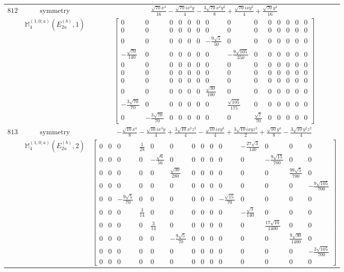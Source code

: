 \documentclass[fleqn,8pt,landscape]{jsarticle}
\begin{document}
\begin{longtable}{ccc}
$ 812 $ & $ \text{symmetry} $ & $ \frac{\sqrt{70} x^{4}}{16} - \frac{\sqrt{70} i x^{3} y}{4} - \frac{3 \sqrt{70} x^{2} y^{2}}{8} + \frac{\sqrt{70} i x y^{3}}{4} + \frac{\sqrt{70} y^{4}}{16} $ \\
$  $ & $ \mathbb{M}_{4}^{(1,0;a)}(E_{2u}^{(b)},1) $ & $ \begin{bmatrix} 0 & 0 & 0 & 0 & 0 & 0 & 0 & 0 & 0 & 0 & 0 & 0 & 0 & 0 \\ 0 & 0 & 0 & 0 & 0 & 0 & 0 & 0 & 0 & 0 & 0 & 0 & 0 & 0 \\ 0 & 0 & 0 & 0 & 0 & 0 & - \frac{9 \sqrt{5}}{50} & 0 & 0 & 0 & 0 & 0 & 0 & 0 \\ - \frac{\sqrt{70}}{140} & 0 & 0 & 0 & 0 & 0 & 0 & - \frac{9 \sqrt{105}}{350} & 0 & 0 & 0 & 0 & 0 & 0 \\ 0 & 0 & 0 & 0 & 0 & 0 & 0 & 0 & 0 & 0 & 0 & 0 & 0 & 0 \\ 0 & 0 & 0 & 0 & 0 & 0 & 0 & 0 & 0 & 0 & 0 & 0 & 0 & 0 \\ 0 & 0 & 0 & 0 & 0 & 0 & 0 & 0 & 0 & 0 & 0 & 0 & 0 & 0 \\ 0 & 0 & 0 & 0 & 0 & 0 & \frac{\sqrt{30}}{100} & 0 & 0 & 0 & 0 & 0 & 0 & 0 \\ - \frac{3 \sqrt{70}}{70} & 0 & 0 & 0 & 0 & 0 & 0 & \frac{\sqrt{105}}{175} & 0 & 0 & 0 & 0 & 0 & 0 \\ 0 & - \frac{3 \sqrt{70}}{70} & 0 & 0 & 0 & 0 & 0 & 0 & \frac{\sqrt{7}}{70} & 0 & 0 & 0 & 0 & 0 \end{bmatrix} $ \\ \hline
$ 813 $ & $ \text{symmetry} $ & $ - \frac{\sqrt{10} x^{4}}{8} - \frac{\sqrt{10} i x^{3} y}{4} + \frac{3 \sqrt{10} x^{2} z^{2}}{4} - \frac{\sqrt{10} i x y^{3}}{4} + \frac{3 \sqrt{10} i x y z^{2}}{2} + \frac{\sqrt{10} y^{4}}{8} - \frac{3 \sqrt{10} y^{2} z^{2}}{4} $ \\
$  $ & $ \mathbb{M}_{4}^{(1,0;a)}(E_{2u}^{(b)},2) $ & $ \begin{bmatrix} 0 & 0 & 0 & \frac{1}{28} & 0 & 0 & 0 & 0 & 0 & 0 & - \frac{27 \sqrt{3}}{140} & 0 & 0 & 0 \\ 0 & 0 & 0 & 0 & - \frac{\sqrt{6}}{56} & 0 & 0 & 0 & 0 & 0 & 0 & - \frac{9 \sqrt{15}}{700} & 0 & 0 \\ 0 & 0 & 0 & 0 & 0 & \frac{\sqrt{30}}{280} & 0 & 0 & 0 & 0 & 0 & 0 & \frac{99 \sqrt{5}}{700} & 0 \\ 0 & 0 & 0 & 0 & 0 & 0 & 0 & 0 & 0 & 0 & 0 & 0 & 0 & - \frac{9 \sqrt{105}}{700} \\ 0 & 0 & - \frac{9 \sqrt{5}}{70} & 0 & 0 & 0 & 0 & 0 & 0 & - \frac{\sqrt{15}}{70} & 0 & 0 & 0 & 0 \\ 0 & 0 & 0 & \frac{3}{14} & 0 & 0 & 0 & 0 & 0 & 0 & - \frac{\sqrt{3}}{140} & 0 & 0 & 0 \\ 0 & 0 & 0 & 0 & \frac{3}{14} & 0 & 0 & 0 & 0 & 0 & 0 & \frac{17 \sqrt{10}}{1400} & 0 & 0 \\ 0 & 0 & 0 & 0 & 0 & - \frac{9 \sqrt{5}}{70} & 0 & 0 & 0 & 0 & 0 & 0 & \frac{9 \sqrt{30}}{1400} & 0 \\ 0 & 0 & 0 & 0 & 0 & 0 & 0 & 0 & 0 & 0 & 0 & 0 & 0 & - \frac{3 \sqrt{105}}{700} \\ 0 & 0 & 0 & 0 & 0 & 0 & 0 & 0 & 0 & 0 & 0 & 0 & 0 & 0 \end{bmatrix} $ \\ \hline

\end{longtable}
\end{document}
